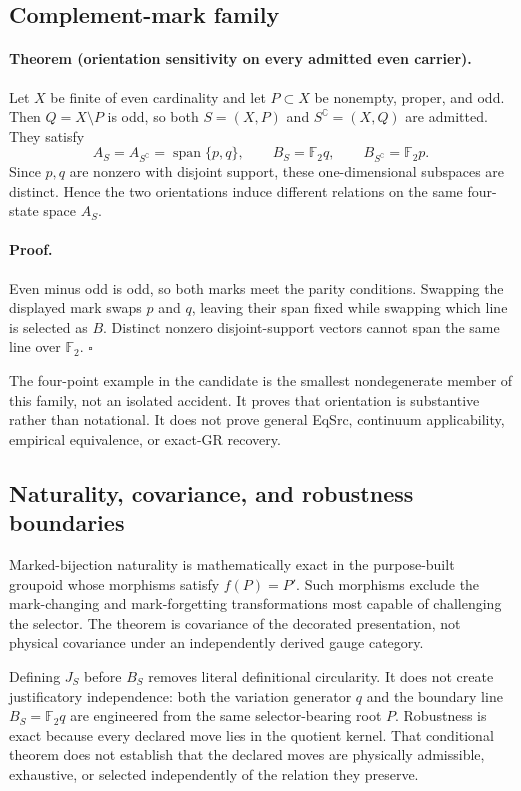 \subsection{Complement-mark family}

\paragraph{Theorem (orientation sensitivity on every admitted even carrier).}
Let \(X\) be finite of even cardinality and let \(P\subset X\) be nonempty,
proper, and odd.  Then \(Q=X\setminus P\) is odd, so both \(S=(X,P)\) and
\(S^\complement=(X,Q)\) are admitted.  They satisfy
\[
 A_S=A_{S^\complement}=\operatorname{span}\{p,q\},
 \qquad B_S=\mathbb F_2q,\qquad
 B_{S^\complement}=\mathbb F_2p .
\]
Since \(p,q\) are nonzero with disjoint support, these one-dimensional
subspaces are distinct.  Hence the two orientations induce different
relations on the same four-state space \(A_S\).

\paragraph{Proof.}
Even minus odd is odd, so both marks meet the parity conditions.  Swapping
the displayed mark swaps \(p\) and \(q\), leaving their span fixed while
swapping which line is selected as \(B\).  Distinct nonzero disjoint-support
vectors cannot span the same line over \(\mathbb F_2\). \(\square\)

The four-point example in the candidate is the smallest nondegenerate member
of this family, not an isolated accident.  It proves that orientation is
substantive rather than notational.  It does not prove general EqSrc,
continuum applicability, empirical equivalence, or exact-GR recovery.

\subsection{Naturality, covariance, and robustness boundaries}

Marked-bijection naturality is mathematically exact in the purpose-built
groupoid whose morphisms satisfy \(f(P)=P'\).  Such morphisms exclude the
mark-changing and mark-forgetting transformations most capable of challenging
the selector.  The theorem is covariance of the decorated presentation, not
physical covariance under an independently derived gauge category.

Defining \(J_S\) before \(B_S\) removes literal definitional circularity.
It does not create justificatory independence: both the variation generator
\(q\) and the boundary line \(B_S=\mathbb F_2q\) are engineered from the same
selector-bearing root \(P\).  Robustness is exact because every declared move
lies in the quotient kernel.  That conditional theorem does not establish
that the declared moves are physically admissible, exhaustive, or selected
independently of the relation they preserve.


